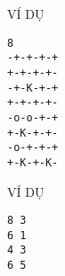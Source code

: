 VÍ DỤ  
\begin{verbatim}
8
-+-+-+-+
+-+-+-+-
-+-K-+-+
+-+-+-+-
-o-o-+-+
+-K-+-+-
-o-+-+-+
+-K-+-K-
\end{verbatim}
   VÍ DỤ  
\begin{verbatim}
8 3
6 1
4 3
6 5
\end{verbatim}